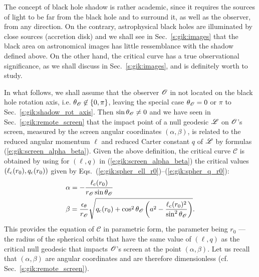 \begin{remark}
The concept of black hole shadow is rather academic, since it
requires the sources of light to be far from the black hole and to surround it, as well
as the observer, from any direction. On the contrary, astrophysical black holes
are illuminated by close sources (accretion disk) and we shall see in Sec.~\ref{s:gik:images}
that the black area on astronomical images has little ressemblance with the shadow defined above.
On the other hand, the critical curve has a true observational significance, as we shall discuss
in Sec.~\ref{s:gik:images}, and is definitely worth to study.
\end{remark}

In what follows, we shall assume that the observer $\mathscr{O}$ in not located
on the black hole rotation axis, i.e. $\theta_{\mathscr{O}}\not\in\{0, \pi\}$,
leaving the special case $\theta_{\mathscr{O}} = 0$ or $\pi$ to Sec.~\ref{s:gik:shadow_rot_axis}.
Then $\sin\theta_{\mathscr{O}}\neq 0$ and we have seen in Sec.~\ref{s:gik:remote_screen} that
the impact point of a null geodesic $\mathscr{L}$ on $\mathscr{O}$'s screen, measured by
the screen angular coordinates
$(\alpha,\beta)$,
is related to the reduced angular momentum $\ell$
and reduced Carter constant $q$ of $\mathscr{L}$ by formulas
(\ref{e:gik:screen_alpha_beta}).
Given the above definition, the critical curve $\mathscr{C}$ is obtained by
using for $(\ell,q)$ in (\ref{e:gik:screen_alpha_beta})
the critical values $(\ell_{\rm c}(r_0),q_{\rm c}(r_0))$
given by Eqs.~(\ref{e:gik:spher_ell_r0})--(\ref{e:gik:spher_q_r0}):
\begin{subequations}
\label{e:gik:shadow_param_eq}
\begin{align}
& \alpha =  - \frac{\ell_{\rm c}(r_0)}{r_{\mathscr{O}}\sin\theta_{\mathscr{O}}}  \label{e:gik:shadow_param_eq_alpha}\\
& \beta =  \frac{\epsilon_\theta}{r_{\mathscr{O}}}
        \sqrt{ q_{\rm c}(r_0) + \cos^2\theta_{\mathscr{O}} \left( a^2
    - \frac{\ell_{\rm c}(r_0)^2}{\sin^2\theta_{\mathscr{O}}} \right) } . \label{e:gik:shadow_param_eq_beta}
\end{align}
\end{subequations}
This provides the equation of $\mathscr{C}$ in parametric form,
the parameter being $r_0$ --- the radius of the spherical orbits that have
the same value of $(\ell, q)$ as the critical null geodesic that impacts
$\mathscr{O}$'s screen at the point $(\alpha,\beta)$.
Let us recall that $(\alpha,\beta)$ are angular coordinates and are therefore dimensionless
(cf. Sec.~\ref{s:gik:remote_screen}).
